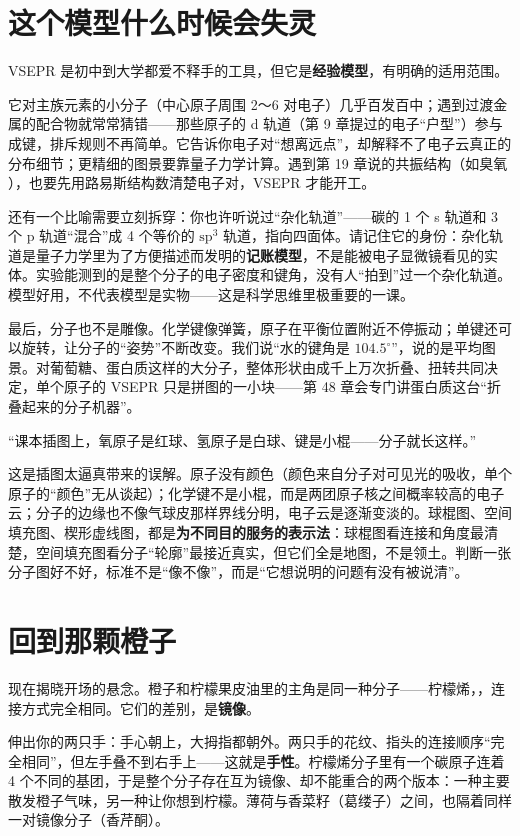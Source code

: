 \section{这个模型什么时候会失灵}

VSEPR 是初中到大学都爱不释手的工具，但它是\textbf{经验模型}，有明确的适用范围。

它对主族元素的小分子（中心原子周围 2～6 对电子）几乎百发百中；遇到过渡金属的配合物就常常猜错——那些原子的 d 轨道（第 9 章提过的电子“户型”）参与成键，排斥规则不再简单。它告诉你电子对“想离远点”，却解释不了电子云真正的分布细节；更精细的图景要靠量子力学计算。遇到第 19 章说的共振结构（如臭氧 ），也要先用路易斯结构数清楚电子对，VSEPR 才能开工。

还有一个比喻需要立刻拆穿：你也许听说过“杂化轨道”——碳的 1 个 s 轨道和 3 个 p 轨道“混合”成 4 个等价的 $\mathrm{sp^3}$ 轨道，指向四面体。请记住它的身份：杂化轨道是量子力学里为了方便描述而发明的\textbf{记账模型}，不是能被电子显微镜看见的实体。实验能测到的是整个分子的电子密度和键角，没有人“拍到”过一个杂化轨道。模型好用，不代表模型是实物——这是科学思维里极重要的一课。

最后，分子也不是雕像。化学键像弹簧，原子在平衡位置附近不停振动；单键还可以旋转，让分子的“姿势”不断改变。我们说“水的键角是 $104.5^{\circ}$”，说的是平均图景。对葡萄糖、蛋白质这样的大分子，整体形状由成千上万次折叠、扭转共同决定，单个原子的 VSEPR 只是拼图的一小块——第 48 章会专门讲蛋白质这台“折叠起来的分子机器”。

\begin{wuqu}
“课本插图上，氧原子是红球、氢原子是白球、键是小棍——分子就长这样。”

这是插图太逼真带来的误解。原子没有颜色（颜色来自分子对可见光的吸收，单个原子的“颜色”无从谈起）；化学键不是小棍，而是两团原子核之间概率较高的电子云；分子的边缘也不像气球皮那样界线分明，电子云是逐渐变淡的。球棍图、空间填充图、楔形虚线图，都是\textbf{为不同目的服务的表示法}：球棍图看连接和角度最清楚，空间填充图看分子“轮廓”最接近真实，但它们全是地图，不是领土。判断一张分子图好不好，标准不是“像不像”，而是“它想说明的问题有没有被说清”。
\end{wuqu}

\section{回到那颗橙子}

现在揭晓开场的悬念。橙子和柠檬果皮油里的主角是同一种分子——柠檬烯，，连接方式完全相同。它们的差别，是\textbf{镜像}。

伸出你的两只手：手心朝上，大拇指都朝外。两只手的花纹、指头的连接顺序“完全相同”，但左手叠不到右手上——这就是\textbf{手性}。柠檬烯分子里有一个碳原子连着 4 个不同的基团，于是整个分子存在互为镜像、却不能重合的两个版本：一种主要散发橙子气味，另一种让你想到柠檬。薄荷与香菜籽（葛缕子）之间，也隔着同样一对镜像分子（香芹酮）。

